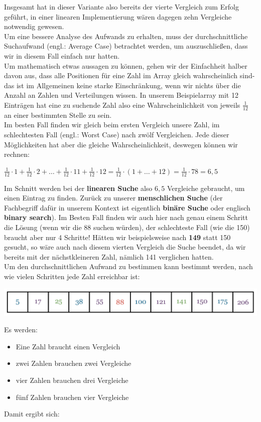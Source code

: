\documentclass{article}
\begin{document}
Insgesamt hat in dieser Variante also bereits der vierte Vergleich zum Erfolg geführt, in einer linearen Implementierung wären dagegen zehn Vergleiche notwendig gewesen.\\
Um eine bessere Analyse des Aufwands zu erhalten, muss der durchschnittliche Suchaufwand (engl.: Average Case) betrachtet werden, um auszuschließen, dass wir in diesem Fall einfach nur  hatten. \\
Um mathematisch etwas aussagen zu können, gehen wir der Einfachheit halber davon aus, dass alle Positionen für eine Zahl im Array gleich wahrscheinlich sind- das ist im Allgemeinen keine starke Einschränkung, wenn wir nichts über die Anzahl an Zahlen und Verteilungen wissen. In unserem Beispielarray mit 12 Einträgen hat eine zu suchende Zahl also eine Wahrscheinlichkeit von jeweils $\frac{1}{12}$ an einer bestimmten Stelle zu sein. \\
Im besten Fall finden wir gleich beim ersten Vergleich unsere Zahl, im schlechtesten Fall (engl.: Worst Case) nach zwölf Vergleichen. Jede dieser Möglichkeiten hat aber die gleiche Wahrscheinlichkeit, deswegen können wir rechnen:
\begin{center}
    $\frac{1}{12}\cdot 1 + \frac{1}{12} \cdot 2 + \dots + \frac{1}{12} \cdot 11 + \frac{1}{12} \cdot 12 = \frac{1}{12} \cdot (1+\dots + 12) = \frac{1}{12}\cdot 78 = 6,5$
\end{center}
Im Schnitt werden bei der \textbf{linearen Suche }also $6,5$ Vergleiche gebraucht, um einen Eintrag zu finden.
\vspace{2mm}
Zurück zu unserer \textbf{menschlichen Suche} (der Fachbegriff dafür in unserem Kontext ist eigentlich \textbf{binäre Suche} oder englisch \textbf{binary search}). Im Besten Fall finden wir auch hier nach genau einem Schritt die Lösung (wenn wir die 88 suchen würden), der schlechteste Fall (wie die 150) braucht aber nur 4 Schritte! Hätten wir beispielsweise nach \textbf{149} statt 150 gesucht, so wäre auch nach diesem vierten Vergleich die Suche beendet, da wir bereits mit der nächstkleineren Zahl, nämlich 141 verglichen hatten. \\
Um den durchschnittlichen Aufwand zu bestimmen kann bestimmt werden, nach wie vielen Schritten jede Zahl erreichbar ist:
\begin{center}
    \includegraphics[scale=0.25]{../../media/search7.png}
\end{center}
Es werden:
\begin{itemize}
    \item Eine Zahl braucht \color{re}einen Vergleich\color{black}
    \item zwei Zahlen brauchen \color{gre}zwei Vergleiche\color{black}
    \item vier Zahlen brauchen \color{blu}drei Vergleiche\color{black}
    \item fünf Zahlen brauchen \color{purp}vier Vergleiche\color{black}
\end{itemize}
Damit ergibt sich:
\end{document}
